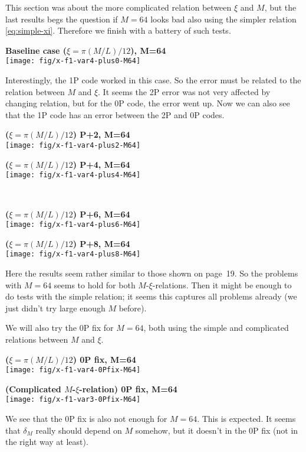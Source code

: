\documentclass[a4paper,10pt]{article}
\begin{document}
This section was about the more complicated relation between
$\xi$ and $M$, but the last results begs the question if $M=64$
looks bad also using the simpler relation \eqref{eq:simple-xi}.
Therefore we finish with a battery of such tests.
\begin{center}
  \textbf{Baseline case ($\xi=\pi(M/L)/12$), M=64}\\
  \texttt{[image: fig/x-f1-var4-plus0-M64]}
\end{center}
Interestingly, the 1P code worked in this case. So the error must
be related to the relation between $M$ and $\xi$. It seems the 2P
error was not very affected by changing relation, but for the 0P
code, the error went up. Now we can also see that the 1P code has
an error between the 2P and 0P codes.\\[\baselineskip]
\begin{minipage}{0.5\textwidth}\centering
  \textbf{($\xi=\pi(M/L)/12$) P+2, M=64}\\
  \texttt{[image: fig/x-f1-var4-plus2-M64]}
\end{minipage}%
\begin{minipage}{0.5\textwidth}\centering
  \textbf{($\xi=\pi(M/L)/12$) P+4, M=64}\\
  \texttt{[image: fig/x-f1-var4-plus4-M64]}
\end{minipage}\\
\begin{minipage}{0.5\textwidth}\centering
  \textbf{($\xi=\pi(M/L)/12$) P+6, M=64}\\
  \texttt{[image: fig/x-f1-var4-plus6-M64]}
\end{minipage}%
\begin{minipage}{0.5\textwidth}\centering
  \textbf{($\xi=\pi(M/L)/12$) P+8, M=64}\\
  \texttt{[image: fig/x-f1-var4-plus8-M64]}
\end{minipage}
Here the results seem rather similar to those shown on page~19.
So the problems with $M=64$ seems to hold for both
$M$-$\xi$-relations. Then it might be enough to do tests with the
simple relation; it seems this captures all problems already (we
just didn't try large enough $M$ before).

We will also try the 0P fix for $M=64$, both using the simple and
complicated relations between $M$ and $\xi$.\\[\baselineskip]
\begin{minipage}{0.5\textwidth}\centering
  \textbf{($\xi=\pi(M/L)/12$) 0P fix, M=64}\\
  \texttt{[image: fig/x-f1-var4-0Pfix-M64]}
\end{minipage}%
\begin{minipage}{0.5\textwidth}\centering
  \textbf{(Complicated $M$-$\xi$-relation) 0P fix, M=64}\\
  \texttt{[image: fig/x-f1-var3-0Pfix-M64]}
\end{minipage}
We see that the 0P fix is also not enough for $M=64$. This is
expected. It seems that $\delta_M$ really should depend on $M$
somehow, but it doesn't in the 0P fix (not in the right way at
least).
\end{document}
